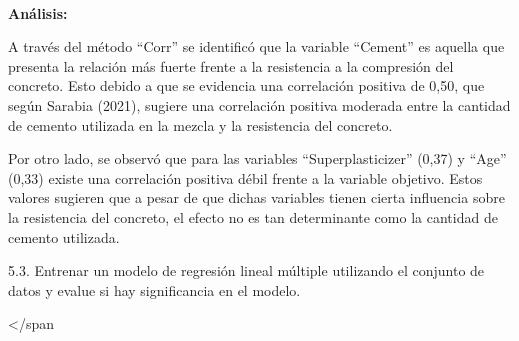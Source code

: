 \documentclass[11pt]{article}
\begin{document}
    \begin{center}
    \end{center}
    { \hspace*{\fill} \\}
    
    \textbf{Análisis:}

A través del método ``Corr'' se identificó que la variable ``Cement'' es
aquella que presenta la relación más fuerte frente a la resistencia a la
compresión del concreto. Esto debido a que se evidencia una correlación
positiva de 0,50, que según Sarabia (2021), sugiere una correlación
positiva moderada entre la cantidad de cemento utilizada en la mezcla y
la resistencia del concreto.

Por otro lado, se observó que para las variables ``Superplasticizer''
(0,37) y ``Age'' (0,33) existe una correlación positiva débil frente a
la variable objetivo. Estos valores sugieren que a pesar de que dichas
variables tienen cierta influencia sobre la resistencia del concreto, el
efecto no es tan determinante como la cantidad de cemento utilizada.

    5.3. Entrenar un modelo de regresión lineal múltiple utilizando el
conjunto de datos y evalue si hay significancia en el modelo.

\textless/span
\end{document}
